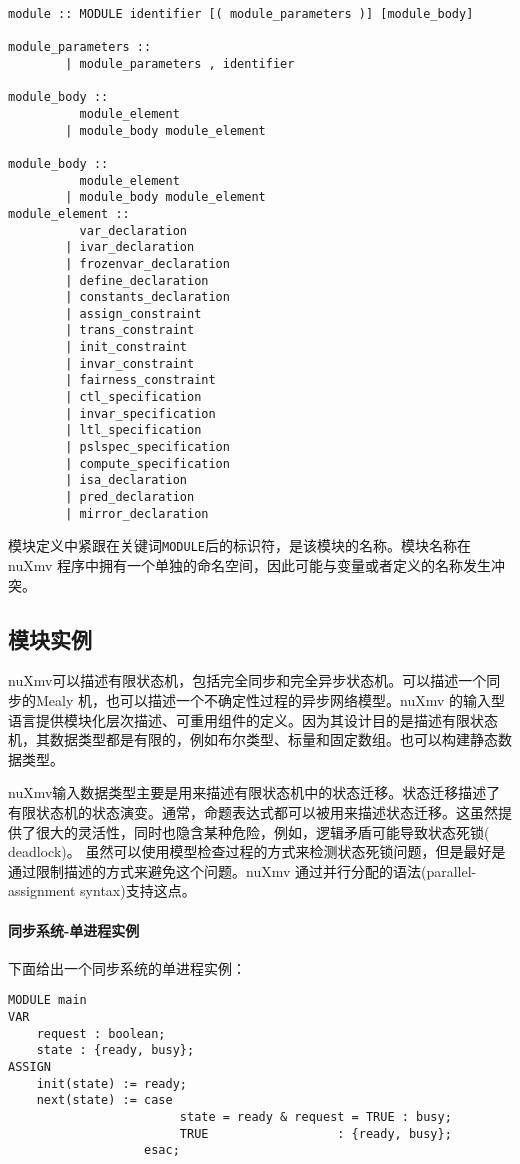 \begin{lstlisting}
module :: MODULE identifier [( module_parameters )] [module_body]

module_parameters ::
        | module_parameters , identifier

module_body ::
          module_element
        | module_body module_element

module_body ::
          module_element
        | module_body module_element
module_element ::
          var_declaration
        | ivar_declaration
        | frozenvar_declaration
        | define_declaration
        | constants_declaration
        | assign_constraint
        | trans_constraint
        | init_constraint
        | invar_constraint
        | fairness_constraint
        | ctl_specification
        | invar_specification
        | ltl_specification
        | pslspec_specification
        | compute_specification
        | isa_declaration
        | pred_declaration
        | mirror_declaration
\end{lstlisting}

模块定义中紧跟在关键词\verb|MODULE|后的标识符，是该模块的名称。模块名称在nuXmv 程序中拥有一个单独的命名空间，因此可能与变量或者定义的名称发生冲突。

\subsection{模块实例}
nuXmv可以描述有限状态机，包括完全同步和完全异步状态机。可以描述一个同步的Mealy 机，也可以描述一个不确定性过程的异步网络模型。nuXmv 的输入型语言提供模块化层次描述、可重用组件的定义。因为其设计目的是描述有限状态机，其数据类型都是有限的，例如布尔类型、标量和固定数组。也可以构建静态数据类型。

nuXmv输入数据类型主要是用来描述有限状态机中的状态迁移。状态迁移描述了有限状态机的状态演变。通常，命题表达式都可以被用来描述状态迁移。这虽然提供了很大的灵活性，同时也隐含某种危险，例如，逻辑矛盾可能导致状态死锁( deadlock)。 虽然可以使用模型检查过程的方式来检测状态死锁问题，但是最好是通过限制描述的方式来避免这个问题。nuXmv 通过并行分配的语法(parallel-assignment syntax)支持这点。

\paragraph{同步系统-单进程实例}
下面给出一个同步系统的单进程实例：
\begin{lstlisting}
MODULE main
VAR
    request : boolean;
    state : {ready, busy};
ASSIGN
    init(state) := ready;
    next(state) := case
                        state = ready & request = TRUE : busy;
                        TRUE                  : {ready, busy};
                   esac;
\end{lstlisting}

